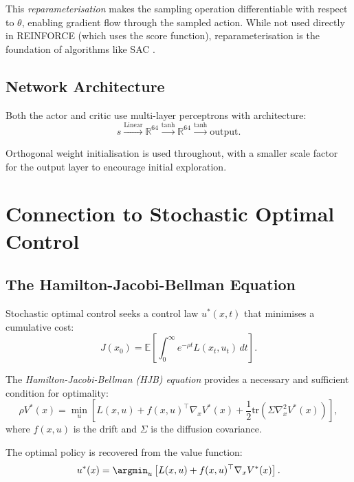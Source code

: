 \documentclass[11pt, a4paper]{article}
\newcommand{\R}{\mathbb{R}}
\newcommand{\E}{\mathbb{E}}
\newcommand{\tr}{\mathrm{tr}}
\newcommand{\T}{\top}
\newcommand{\grad}{\nabla}
\begin{document}
This \emph{reparameterisation} makes the sampling operation differentiable
with respect to $\theta$, enabling gradient flow through the sampled action.
While not used directly in REINFORCE (which uses the score function),
reparameterisation is the foundation of algorithms like SAC \citep{haarnoja2018}.

\subsection{Network Architecture}

Both the actor and critic use multi-layer perceptrons with architecture:
\[
    s \xrightarrow{\text{Linear}} \R^{64} \xrightarrow{\tanh} \R^{64} \xrightarrow{\tanh} \text{output}.
\]

Orthogonal weight initialisation \citep{saxe2013} is used throughout, with
a smaller scale factor for the output layer to encourage initial exploration.

\section{Connection to Stochastic Optimal Control}
\label{sec:optimal_control}

\subsection{The Hamilton-Jacobi-Bellman Equation}

Stochastic optimal control seeks a control law $u^*(x, t)$ that minimises
a cumulative cost:
\begin{equation}
    J(x_0) = \E\left[ \int_0^\infty e^{-\rho t} L(x_t, u_t) \, dt \right].
\end{equation}

The \emph{Hamilton-Jacobi-Bellman (HJB) equation} provides a necessary and
sufficient condition for optimality:
\begin{equation}
    \rho V^*(x) = \min_u \left[ L(x, u) + f(x, u)^\T \grad_x V^*(x) + \frac{1}{2} \tr(\Sigma \grad_x^2 V^*(x)) \right],
    \label{eq:hjb}
\end{equation}
where $f(x, u)$ is the drift and $\Sigma$ is the diffusion covariance.

The optimal policy is recovered from the value function:
\begin{equation}
    u^*(x) = \argmin_u \left[ L(x, u) + f(x, u)^\T \grad_x V^*(x) \right].
\end{equation}
\end{document}
